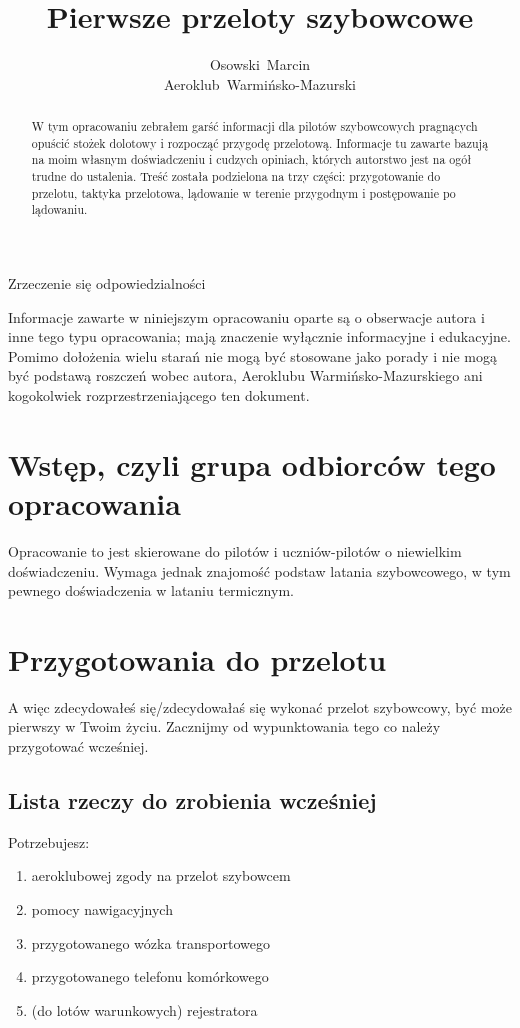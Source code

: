 \documentclass{article}
\title{Pierwsze przeloty szybowcowe}
\author{Osowski~Marcin\\Aeroklub~Warmińsko-Mazurski}
\begin{document}
\maketitle
\newpage

\begin{abstract}
W tym opracowaniu zebrałem garść informacji dla pilotów szybowcowych
pragnących opuścić stożek dolotowy i rozpocząć
przygodę przelotową. Informacje tu zawarte bazują na moim
własnym doświadczeniu i cudzych opiniach, których autorstwo jest na ogół
trudne do ustalenia. Treść została podzielona na trzy części:
przygotowanie do przelotu, taktyka przelotowa, 
lądowanie w terenie przygodnym i postępowanie po lądowaniu.
\end{abstract}
\newpage

\begin{center}\begin{huge}
Zrzeczenie się odpowiedzialności
\end{huge}\end{center}
Informacje zawarte w niniejszym opracowaniu oparte są o obserwacje
autora i inne tego typu opracowania; mają znaczenie wyłącznie informacyjne
i edukacyjne. Pomimo dołożenia wielu starań nie mogą być stosowane
jako porady i nie mogą być podstawą roszczeń wobec autora,
Aeroklubu Warmińsko-Mazurskiego ani kogokolwiek rozprzestrzeniającego
ten dokument.
\newpage


\tableofcontents
\newpage


\section{Wstęp, czyli grupa odbiorców tego opracowania}
Opracowanie to jest skierowane do pilotów i uczniów-pilotów o niewielkim
doświadczeniu. Wymaga jednak znajomość podstaw latania szybowcowego, w tym
pewnego doświadczenia w lataniu termicznym.
\newpage


\section{Przygotowania do przelotu}
A więc zdecydowałeś się/zdecydowałaś się wykonać przelot szybowcowy, być może
pierwszy w Twoim życiu. Zacznijmy od wypunktowania tego co należy
przygotować wcześniej.

\subsection{Lista rzeczy do zrobienia wcześniej}
Potrzebujesz:
\begin{enumerate}
\item aeroklubowej zgody na przelot szybowcem
\item pomocy nawigacyjnych
\item przygotowanego wózka transportowego
\item przygotowanego telefonu komórkowego
\item (do lotów warunkowych) rejestratora
\end{enumerate}
\end{document}
